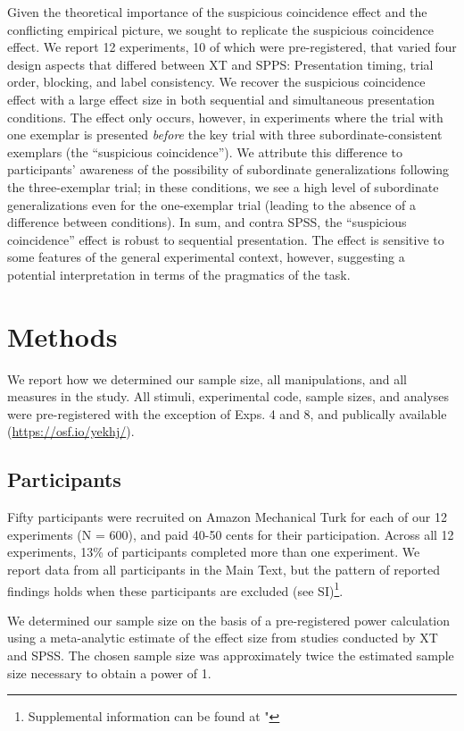 \documentclass[english,floatsintext,man]{apa6}
\theoremstyle{definition}
\theoremstyle{definition}
\theoremstyle{remark}
\begin{document}
Given the theoretical importance of the suspicious coincidence effect
and the conflicting empirical picture, we sought to replicate the
suspicious coincidence effect. We report 12 experiments, 10 of which
were pre-registered, that varied four design aspects that differed
between XT and SPPS: Presentation timing, trial order, blocking, and
label consistency. We recover the suspicious coincidence effect with a
large effect size in both sequential and simultaneous presentation
conditions. The effect only occurs, however, in experiments where the
trial with one exemplar is presented \emph{before} the key trial with
three subordinate-consistent exemplars (the \enquote{suspicious
coincidence}). We attribute this difference to participants' awareness
of the possibility of subordinate generalizations following the
three-exemplar trial; in these conditions, we see a high level of
subordinate generalizations even for the one-exemplar trial (leading to
the absence of a difference between conditions). In sum, and contra
SPSS, the \enquote{suspicious coincidence} effect is robust to
sequential presentation. The effect is sensitive to some features of the
general experimental context, however, suggesting a potential
interpretation in terms of the pragmatics of the task.

\section{Methods}\label{methods}

We report how we determined our sample size, all manipulations, and all
measures in the study. All stimuli, experimental code, sample sizes, and
analyses were pre-registered with the exception of Exps. 4 and 8, and
publically available (\url{https://osf.io/yekhj/}).

\subsection{Participants}\label{participants}

Fifty participants were recruited on Amazon Mechanical Turk for each of
our 12 experiments (N = 600), and paid 40-50 cents for their
participation. Across all 12 experiments, 13\% of participants completed
more than one experiment. We report data from all participants in the
Main Text, but the pattern of reported findings holds when these
participants are excluded (see
SI)\footnote{Supplemental information can be found at "}.

We determined our sample size on the basis of a pre-registered power
calculation using a meta-analytic estimate of the effect size from
studies conducted by XT and SPSS. The chosen sample size was
approximately twice the estimated sample size necessary to obtain a
power of 1.
\end{document}
